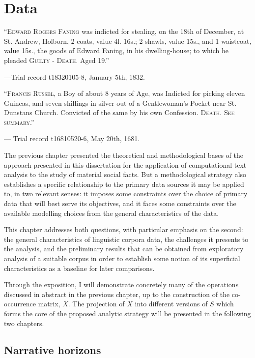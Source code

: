 \chapter{Data}
\label{chap:pob}

\epigraph{
    ``\textsc{Edward Rogers Faning} was indicted for stealing, on the 18th of December, at St. Andrew, Holborn, 2 coats, value 4l. 16s.; 2 shawls, value 15s., and 1 waistcoat, value 15s., the goods of Edward Faning, in his dwelling-house; to which he pleaded \textsc{Guilty - Death}. Aged 19.''
}{
    ---\textup{Trial record t18320105-8, January 5th, 1832.}
}

\epigraph{
    ``\textsc{Francis Russel}, a Boy of about 8 years of Age, was Indicted for picking eleven Guineas, and seven shillings in silver out of a Gentlewoman's Pocket near St. Dunstans Church. Convicted of the same by his own Confession. \textsc{Death. See summary}.''
}{
    --- \textup{Trial record t16810520-6, May 20th, 1681.}
}

The previous chapter presented the theoretical and methodological bases of the approach presented in this dissertation for the application of computational text analysis to the study of material social facts.
But a methodological strategy also establishes a specific relationship to the primary data sources it may be applied to, in two relevant senses: it imposes some constraints over the choice of primary data that will best serve its objectives, and it faces some constraints over the available modelling choices from the general characteristics of the data.

This chapter addresses both questions, with particular emphasis on the second: the general characteristics of linguistic corpora data, the challenges it presents to the analysis, and the preliminary results that can be obtained from exploratory analysis of a suitable corpus in order to establish some notion of its superficial characteristics as a baseline for later comparisons.

Through the exposition, I will demonstrate concretely many of the operations discussed in abstract in the previous chapter, up to the construction of the co-occurrence matrix, $X$.
The projection of $X$ into different versions of $S$ which forms the core of the proposed analytic strategy will be presented in the following two chapters.

\section{Narrative horizons}
\label{sec:narhorizons}

